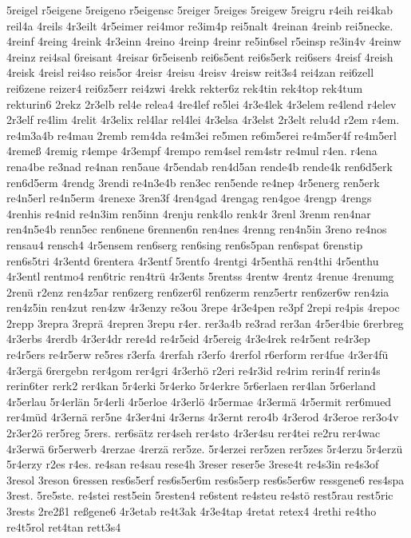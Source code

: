 {5reigel
r5eigene
5reigeno
r5eigensc
5reiger
5reiges
5reigew
5reigru
r4eih
rei4kab
reil4a
4reils
4r3eilt
4r5eimer
rei4mor
re3im4p
rei5nalt
4reinan
4reinb
rei5necke.
4reinf
4reing
4reink
4r3einn
4reino
4reinp
4reinr
re5in6sel
r5einsp
re3in4v
4reinw
4reinz
rei4sal
6reisant
4reisar
6r5eisenb
rei6s5ent
rei6s5erk
rei6sers
4reisf
4reish
4reisk
4reisl
rei4so
reis5or
4reisr
4reisu
4reisv
4reisw
reit3s4
rei4zan
rei6zell
rei6zene
reizer4
rei6z5err
rei4zwi
4rekk
rekter6z
rek4tin
rek4top
rek4tum
rekturin6
2rekz
2r3elb
rel4e
relea4
4re4lef
re5lei
4r3e4lek
4r3elem
re4lend
r4elev
2r3elf
re4lim
4relit
4r3elix
rel4lar
rel4lei
4r3elsa
4r3elst
2r3elt
relu4d
r2em
r4em.
re4m3a4b
re4mau
2remb
rem4da
re4m3ei
re5men
re6m5erei
re4m5er4f
re4m5erl
4remeß
4remig
r4empe
4r3empf
4rempo
rem4sel
rem4str
re4mul
r4en.
r4ena
rena4be
re3nad
re4nan
ren5aue
4r5endab
ren4d5an
rende4b
rende4k
ren6d5erk
ren6d5erm
4rendg
3rendi
re4n3e4b
ren3ec
ren5ende
re4nep
4r5energ
ren5erk
re4n5erl
re4n5erm
4renexe
3ren3f
4ren4gad
4rengag
ren4goe
4rengp
4rengs
4renhis
re4nid
re4n3im
ren5inn
4renju
renk4lo
renk4r
3renl
3renm
ren4nar
ren4n5e4b
renn5ec
ren6nene
6rennen6n
ren4nes
4renng
ren4n5in
3reno
re4nos
rensau4
rensch4
4r5ensem
ren6serg
ren6sing
ren6s5pan
ren6spat
6renstip
ren6s5tri
4r3entd
6rentera
4r3entf
5rentfo
4rentgi
4r5enthä
ren4thi
4r5enthu
4r3entl
rentmo4
ren6tric
ren4trü
4r3ents
5rentss
4rentw
4rentz
4renue
4renumg
2renü
r2enz
ren4z5ar
ren6zerg
ren6zer6l
ren6zerm
renz5ertr
ren6zer6w
ren4zia
ren4z5in
ren4zut
ren4zw
4r3enzy
re3ou
3repe
4r3e4pen
re3pf
2repi
re4pis
4repoc
2repp
3repra
3reprä
4repren
3repu
r4er.
rer3a4b
re3rad
rer3an
4r5er4bie
6rerbreg
4r3erbs
4rerdb
4r3er4dr
rere4d
re4r5eid
4r5ereig
4r3e4rek
re4r5ent
re4r3ep
re4r5ers
re4r5erw
re5res
r3erfa
4rerfah
r3erfo
4rerfol
r6erform
rer4fue
4r3er4fü
4r3ergä
6rergebn
rer4gom
rer4gri
4r3erhö
r2eri
re4r3id
re4rim
rerin4f
rerin4s
rerin6ter
rerk2
rer4kan
5r4erki
5r4erko
5r4erkre
5r6erlaen
rer4lan
5r6erland
4r5erlau
5r4erlän
5r4erli
4r5erloe
4r3erlö
4r5ermae
4r3ermä
4r5ermit
rer6mued
rer4müd
4r3ernä
rer5ne
4r3er4ni
4r3erns
4r3ernt
rero4b
4r3erod
4r3eroe
rer3o4v
2r3er2ö
rer5reg
5rers.
rer6sätz
rer4seh
rer4sto
4r3er4su
rer4tei
re2ru
rer4wac
4r3erwä
6r5erwerb
4rerzae
4rerzä
rer5ze.
5r4erzei
rer5zen
rer5zes
5r4erzu
5r4erzü
5r4erzy
r2es
r4es.
re4san
re4sau
rese4h
3reser
reser5e
3rese4t
re4s3in
re4s3of
3resol
3reson
6ressen
res6s5erf
res6s5er6m
res6s5erp
res6s5er6w
ressgene6
res4spa
3rest.
5re5ste.
re4stei
rest5ein
5resten4
re6stent
re4steu
re4stö
rest5rau
rest5ric
3rests
2re2ß1
reßgene6
4r3etab
re4t3ak
4r3e4tap
4retat
retex4
4rethi
re4tho
re4t5rol
ret4tan
rett3s4
}
